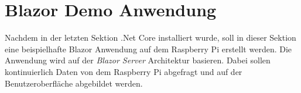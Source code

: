 \section{Blazor Demo Anwendung}
\label{sec:blazordemo}
Nachdem in der letzten Sektion \emph{} .Net Core installiert wurde,
soll in
dieser Sektion eine beispielhafte Blazor Anwendung auf dem Raspberry Pi erstellt werden. Die
Anwendung wird auf der \emph{Blazor Server} Architektur basieren. Dabei sollen kontinuierlich
Daten von dem Raspberry Pi abgefragt und auf der Benutzeroberfläche abgebildet werden.



